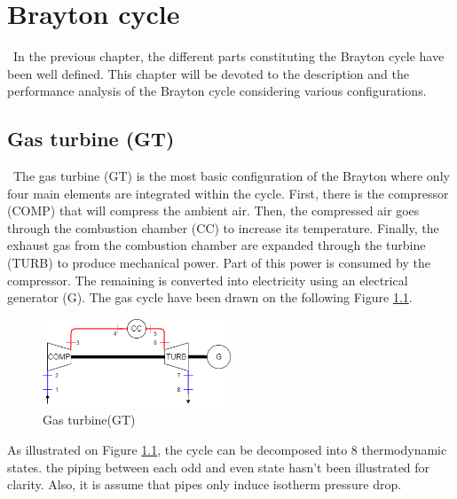 \graphicspath{{Chapitre_4/Images/}}
\chapter{Brayton cycle}\label{C4}
\quad\, In the previous chapter, the different parts constituting the Brayton cycle have been well defined. This chapter will be devoted to the description and the performance analysis of the Brayton cycle considering various configurations.

\section{Gas turbine (GT)}
\quad\, The gas turbine (GT) is the most basic configuration of the Brayton where only four main elements are integrated within the cycle. First, there is the compressor (COMP) that will compress the ambient air. Then, the compressed air goes through the combustion chamber (CC) to increase its temperature. Finally, the exhaust gas from the combustion chamber are expanded through the turbine (TURB) to produce mechanical power. Part of this power is consumed by the compressor. The remaining is converted into electricity using an electrical generator (G). The gas cycle have been drawn on the following Figure \ref{fig:C4_BraytonGT}.

\begin{figure}[h]
\centering
\includegraphics[width=0.5\textwidth] {GT}
\caption{Gas turbine(GT)}
\label{fig:C4_BraytonGT}
\end{figure}



As illustrated on Figure \ref{fig:C4_BraytonGT}, the cycle can be decomposed into 8 thermodynamic states. the piping between each odd and even state hasn't been illustrated for clarity. Also, it is assume that pipes only induce isotherm pressure drop.

